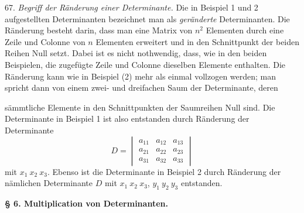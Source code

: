 \documentclass[11pt]{article}
\providecommand{\weberpage}[1]{}
\begin{document}
67. \textit{Begriff der R\"anderung einer Determinante.} Die in Beispiel 1 und 2 aufgestellten Determinanten bezeichnet man als \textit{geränderte} Determinanten. Die Ränderung besteht darin, dass man eine Matrix von $n^2$ Elementen durch eine Zeile und Colonne von $n$ Elementen erweitert und in den Schnittpunkt der beiden Reihen Null setzt. Dabei ist es nicht nothwendig, dass, wie in den beiden Beispielen, die zugefügte Zeile und Colonne dieselben Elemente enthalten. Die Ränderung kann wie in Beispiel (2) mehr als einmal vollzogen werden; man spricht dann von einem zwei- und dreifachen Saum der Determinante, deren


\weberpage{73}
sämmtliche Elemente in den Schnittpunkten der Saumreihen Null sind.
Die Determinante in Beispiel 1 ist also entstanden durch Ränderung
der Determinante
\[
D = \begin{vmatrix} a_{11} & a_{12} & a_{13} \\ a_{21} & a_{22} & a_{23} \\ a_{31} & a_{32} & a_{33} \end{vmatrix}
\]
mit $x_1\ x_2\ x_3$. Ebenso ist die Determinante in Beispiel 2 durch
Ränderung der nämlichen Determinante $D$ mit $x_1\ x_2\ x_3$, $y_1\ y_2\ y_3$
entstanden.

\begin{center}
\textbf{§ 6. Multiplication von Determinanten.}
\end{center}
\end{document}
